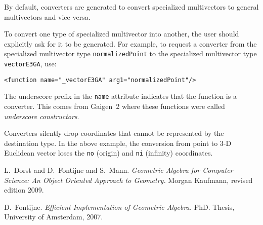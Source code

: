 \documentclass[10pt, a4paper]{article}
\begin{document}
By default, converters are generated to convert specialized multivectors
to general multivectors and vice versa.

To convert one type of specialized multivector into another, the user
should explicitly ask for it to be generated. For example, to request
a converter from the specialized multivector type {\tt normalizedPoint}
to the specialized multivector type {\tt vectorE3GA}, use:
\begin{verbatim}
<function name="_vectorE3GA" arg1="normalizedPoint"/>
\end{verbatim}
The underscore prefix in the {\tt name} attribute indicates that the function 
is a converter. This comes from Gaigen~2 where these functions were called
\emph{underscore constructors}.

Converters silently drop coordinates that cannot be represented by the
destination type. In the above example, the conversion from point to
3-D Euclidean vector loses the {\tt no} (origin) and {\tt ni} (infinity)
coordinates.



\iffalse
\section{Why did you write Gaigen 2.5 in C\#?}

I wrote Gaigen 2.5 in C\# because I wanted to try out the .Net platform
(it's pretty nice).
I assumed that Mono would be good enough to run Gaigen 2.5 on OS X and
Linux, but it is slightly disappointing in speed. Hopefully the Mono
team will improve Mono's performance in the future.
\fi



\begin{thebibliography}{}


	
 L.~Dorst and D.~Fontijne and S.~Mann.
	\emph{Geometric Algebra for Computer Science: An Object Oriented Approach to Geometry.}
	Morgan Kaufmann, revised edition 2009.

 D.~Fontijne.
	\emph{Efficient Implementation of Geometric Algebra.}
	PhD. Thesis, University of Amsterdam, 2007.


\end{thebibliography}
\end{document}
